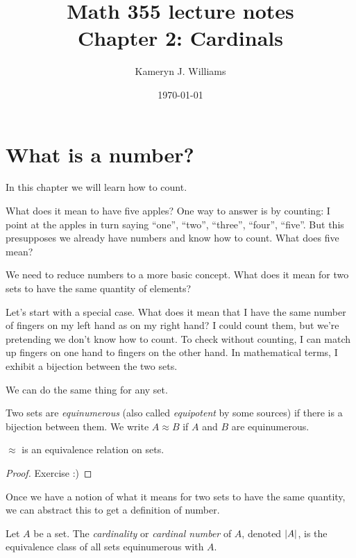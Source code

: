 \documentclass[10pt]{amsart}
\title{Math 355 lecture notes \\ Chapter 2: Cardinals}
\author{Kameryn J. Williams}
\date{\today}
\begin{document}
\maketitle

\section{What is a number?}

In this chapter we will learn how to count.

What does it mean to have five apples? One way to answer is by counting: I point at the apples in turn saying ``one'', ``two'', ``three'', ``four'', ``five''. But this presupposes we already have numbers and know how to count. What does five mean?

We need to reduce numbers to a more basic concept. What does it mean for two sets to have the same quantity of elements? 

Let's start with a special case. What does it mean that I have the same number of fingers on my left hand as on my right hand? I could count them, but we're pretending we don't know how to count. To check without counting, I can match up fingers on one hand to fingers on the other hand. In mathematical terms, I exhibit a bijection between the two sets.

We can do the same thing for any set.

\begin{definition}[Cantor]
Two sets are \emph{equinumerous} (also called \emph{equipotent} by some sources) if there is a bijection between them. We write $A \approx B$ if $A$ and $B$ are equinumerous.
\end{definition}

\begin{proposition}
$\approx$ is an equivalence relation on sets.
\end{proposition}

\begin{proof}
Exercise :)
\end{proof}

Once we have a notion of what it means for two sets to have the same quantity, we can abstract this to get a definition of number.

\begin{definition}[Cantor]
Let $A$ be a set. The \emph{cardinality} or \emph{cardinal number} of $A$, denoted $\left\lvert A \right\rvert$, is the equivalence class of all sets equinumerous with $A$. 
\end{definition}
\end{document}
